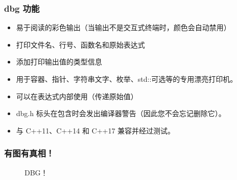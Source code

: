 \documentclass[xcolor=table,dvipsnames,svgnames,aspectratio=169]{ctexbeamer}
\begin{document}
\begin{frame}
  \frametitle{dbg 功能}

  \begin{itemize}
    \item 易于阅读的彩色输出（当输出不是交互式终端时，颜色会自动禁用）
    \item 打印文件名、行号、函数名和原始表达式
    \item 添加打印输出值的类型信息
    \item 用于容器、指针、字符串文字、枚举、std::可选等的专用漂亮打印机。
    \item 可以在表达式内部使用（传递原始值）
    \item dbg.h 标头在包含时会发出编译器警告（因此您不会忘记删除它）。
    \item 与 C++11、C++14 和 C++17 兼容并经过测试。
  \end{itemize}
\end{frame}


\begin{frame}
  \frametitle{有图有真相！}
  \begin{figure}
    \centering
    \caption{DBG！}
  \end{figure}
\end{frame}

\makebottom
\end{document}
